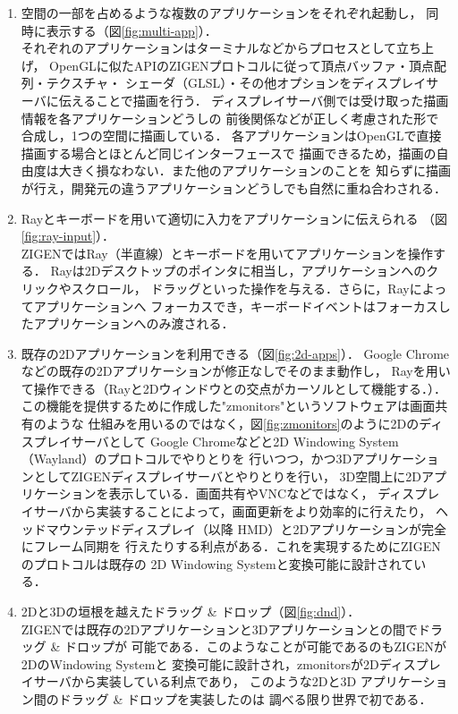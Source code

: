\begin{enumerate}
  \item 空間の一部を占めるような複数のアプリケーションをそれぞれ起動し，
        同時に表示する（図\ref{fig:multi-app}）．\\
        それぞれのアプリケーションはターミナルなどからプロセスとして立ち上げ，
        OpenGLに似たAPIのZIGENプロトコルに従って頂点バッファ・頂点配列・テクスチャ・
        シェーダ（GLSL）・その他オプションをディスプレイサーバに伝えることで描画を行う．
        ディスプレイサーバ側では受け取った描画情報を各アプリケーションどうしの
        前後関係などが正しく考慮された形で合成し，1つの空間に描画している．
        各アプリケーションはOpenGLで直接描画する場合とほとんど同じインターフェースで
        描画できるため，描画の自由度は大きく損なわない．また他のアプリケーションのことを
        知らずに描画が行え，開発元の違うアプリケーションどうしでも自然に重ね合わされる．
  \item Rayとキーボードを用いて適切に入力をアプリケーションに伝えられる
        （図\ref{fig:ray-input}）． \\
        ZIGENではRay（半直線）とキーボードを用いてアプリケーションを操作する．
        Rayは2Dデスクトップのポインタに相当し，アプリケーションへのクリックやスクロール，
        ドラッグといった操作を与える．さらに，Rayによってアプリケーションへ
        フォーカスでき，キーボードイベントはフォーカスしたアプリケーションへのみ渡される．
  \item 既存の2Dアプリケーションを利用できる（図\ref{fig:2d-apps}）．
        Google Chromeなどの既存の2Dアプリケーションが修正なしでそのまま動作し，
        Rayを用いて操作できる（Rayと2Dウィンドウとの交点がカーソルとして機能する．）．
        この機能を提供するために作成した"zmonitors"というソフトウェアは画面共有のような
        仕組みを用いるのではなく，図\ref{fig:zmonitors}のように2Dのディスプレイサーバとして
        Google Chromeなどと2D Windowing System（Wayland）のプロトコルでやりとりを
        行いつつ，かつ3DアプリケーションとしてZIGENディスプレイサーバとやりとりを行い，
        3D空間上に2Dアプリケーションを表示している．画面共有やVNCなどではなく，
        ディスプレイサーバから実装することによって，画面更新をより効率的に行えたり，
        ヘッドマウンテッドディスプレイ（以降 HMD）と2Dアプリケーションが完全にフレーム同期を
        行えたりする利点がある．これを実現するためにZIGENのプロトコルは既存の
        2D Windowing Systemと変換可能に設計されている．
  \item 2Dと3Dの垣根を越えたドラッグ \& ドロップ（図\ref{fig:dnd}）． \\
        ZIGENでは既存の2Dアプリケーションと3Dアプリケーションとの間でドラッグ \& ドロップが
        可能である．このようなことが可能であるのもZIGENが2DのWindowing Systemと
        変換可能に設計され，zmonitorsが2Dディスプレイサーバから実装している利点であり，
        このような2Dと3D アプリケーション間のドラッグ \& ドロップを実装したのは
        調べる限り世界で初である．
\end{enumerate}

